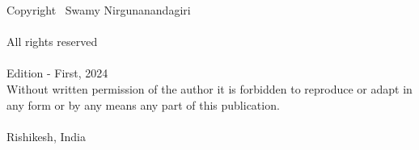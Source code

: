\thispagestyle{empty}
Copyright \textcopyright\ Swamy Nirgunanandagiri\\
\\
All rights reserved\\
\\
Edition - First, 2024\\
\vfill
Without written permission of the author it is forbidden to reproduce or adapt in any form or by any means any part of this  publication.\\
\\
Rishikesh, India\\
\newpage